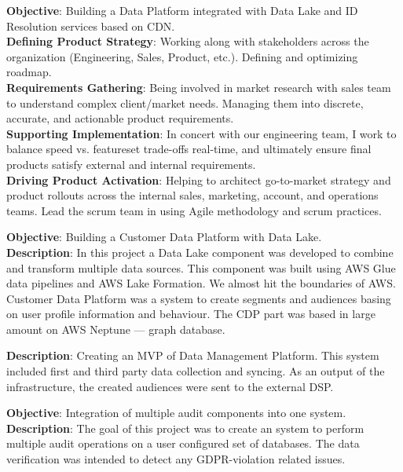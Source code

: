 \documentclass[11pt,a4paper,sans]{moderncv} %
\begin{document}
{\textbf{Objective}: Building a Data Platform integrated with Data Lake and ID Resolution services based on CDN.\\
\textbf{Defining Product Strategy}: Working along with stakeholders across the organization (Engineering, Sales, Product, etc.). Defining and optimizing roadmap.\\
\textbf{Requirements Gathering}: Being involved in market research with sales team to understand complex client/market needs. Managing them into discrete, accurate, and actionable product requirements.\\
\textbf{Supporting Implementation}: In concert with our engineering team, I work to balance speed vs. featureset trade-offs real-time, and ultimately ensure final products satisfy external and internal requirements.\\
\textbf{Driving Product Activation}: Helping to architect go-to-market strategy and product rollouts across the internal sales, marketing, account, and operations teams. Lead the scrum team in using Agile methodology and scrum practices.
}

{\textbf{Objective}: Building a Customer Data Platform with Data Lake.\\
\textbf{Description}: In this project a Data Lake component was developed to combine and transform multiple data sources.
This component was built using AWS Glue data pipelines and AWS Lake Formation. We almost hit the boundaries of AWS.
Customer Data Platform was a system to create segments and audiences basing on user profile information and behaviour. The CDP part was based in large amount on AWS Neptune --- graph database.
}

{\textbf{Description}: Creating an MVP of Data Management Platform. This system included first and third party data collection and syncing. As an output of the infrastructure, the created audiences were sent to the external DSP.
}

{\textbf{Objective}: Integration of multiple audit components into one system.\\
\textbf{Description}: The goal of this project was to create an system to perform multiple audit operations on a user configured set of databases. The data verification was intended to detect any GDPR-violation related issues.
}
\end{document}
